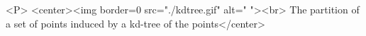 \lcHtml{\label{KDT_fig:kdtree}}
\begin{ccHtmlOnly}
<P>
<center><img border=0 src="./kdtree.gif" alt=" "><br>
The partition of a set of  points induced by a kd-tree of the points</center>
\end{ccHtmlOnly}


%
%


%



